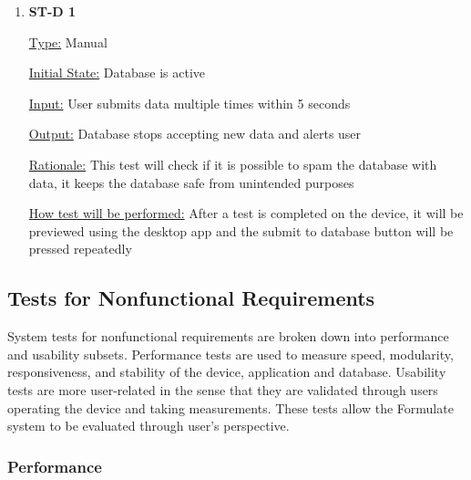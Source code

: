 \documentclass[12pt, titlepage]{article}
\begin{document}
\begin{enumerate}
  
  \item{\bf{ST-D 1}}
  
  \underline{Type:} Manual
            
  \underline{Initial State:} Database is active
            
  \underline{Input:} User submits data multiple times within 5 seconds
            
  \underline{Output:} Database stops accepting new data and alerts user

  \underline{Rationale:} This test will check if it is possible to spam the database with data, it keeps the database safe from unintended purposes
            
  \underline{How test will be performed:} After a test is completed on the device, it will be previewed using the desktop app and the submit to database button will be pressed repeatedly\\
\end{enumerate}

\subsection{Tests for Nonfunctional Requirements}
System tests for nonfunctional requirements are broken down into performance and usability subsets. Performance tests are used to measure speed, modularity, responsiveness, and stability of
the device, application and database. Usability tests are more user-related in the sense that they are validated through users operating the device and taking measurements. These tests allow the Formulate system to be evaluated 
through user's perspective.



\subsubsection{Performance}
		
\end{document}
